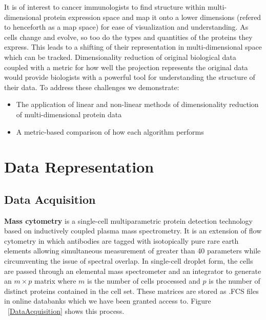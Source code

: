 \documentclass{article}
\begin{document}
It is of interest to cancer immunologists to find structure within multi-dimensional protein expression space and map it onto a lower dimensions (refered to henceforth as a map space) for ease of visualization and understanding. As cells change and evolve, so too do the types and quantities of the proteins they express. This leads to a shifting of their representation in multi-dimensional space which can be tracked. Dimensionality reduction of original biological data coupled with a metric for how well the projection represents the original data would provide biologists with a powerful tool for understanding the structure of their data. To address these challenges we demonstrate:

\begin{itemize}
\item The application of linear and non-linear methods of dimensionality reduction of multi-dimensional protein data
\item A metric-based comparison of how each algorithm performs
\end{itemize}

\section{Data Representation}
\label{data_representation}

\subsection{Data Acquisition}

\textbf{Mass cytometry} is a single-cell multiparametric protein detection technology based on inductively coupled plasma mass spectrometry. It is an extension of flow cytometry in which antibodies are tagged with isotopically pure rare earth elements allowing simultaneous measurement of greater than 40 parameters while circumventing the issue of spectral overlap. In single-cell droplet form, the cells are passed through an elemental mass spectrometer and an integrator to generate an $m \times p$ matrix where $m$ is the number of cells processed and $p$ is the number of distinct proteins contained in the cell set. These matrices are stored as .FCS files in online databanks which we have been granted access to. Figure ~\ref{DataAcquisition} shows this process. 
\end{document}
